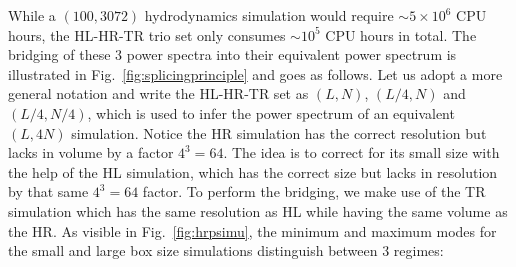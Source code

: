 While a $(100, 3072)$ hydrodynamics simulation would require $\sim 5 \times 10^6$ CPU hours, the HL-HR-TR trio set only consumes $\sim 10^5$ CPU hours in total. The bridging of these 3 power spectra into their equivalent power spectrum is illustrated in Fig.~\ref{fig:splicingprinciple} and goes as follows. Let us adopt a more general notation and write the HL-HR-TR set as $(L, N)$, $(L/4, N)$ and $(L/4, N/4)$, which is used to infer the power spectrum of an equivalent $(L, 4N)$ simulation. Notice the HR simulation has the correct resolution but lacks in volume by a factor $4^3 = 64$. The idea is to correct for its small size with the help of the HL simulation, which has the correct size but lacks in resolution by that same $4^3=64$ factor. To perform the bridging, we make use of the TR simulation which has the same resolution as HL while having the same volume as the HR. As visible in Fig.~\ref{fig:hrpsimu}, the minimum and maximum modes for the small and large box size simulations distinguish between 3 regimes:\\
